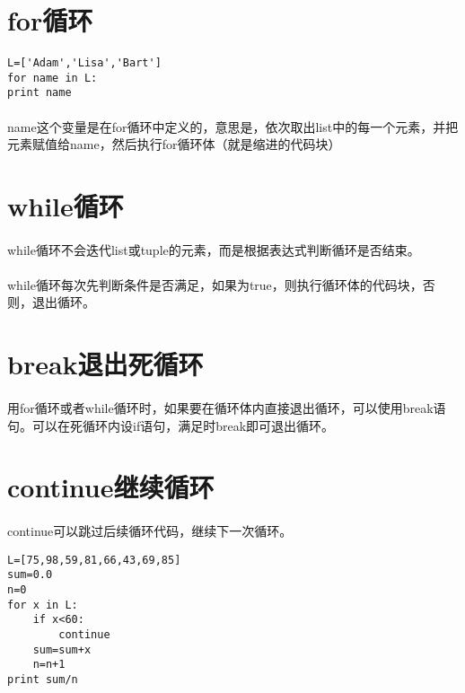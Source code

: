 \documentclass{article}
\begin{document}
\begin{CJK}{UTF8}{gbsn}
\section{for循环}
\paragraph{}
\begin{verbatim}
L=['Adam','Lisa','Bart']
for name in L:
print name
\end{verbatim}
\paragraph{}
name这个变量是在for循环中定义的，意思是，依次取出list中的每一个元素，并把元素赋值给name，然后执行for循环体（就是缩进的代码块）
\section{while循环}
\paragraph{}
while循环不会迭代list或tuple的元素，而是根据表达式判断循环是否结束。
\paragraph{}
while循环每次先判断条件是否满足，如果为true，则执行循环体的代码块，否则，退出循环。
\section{break退出死循环}
\paragraph{}
用for循环或者while循环时，如果要在循环体内直接退出循环，可以使用break语句。可以在死循环内设if语句，满足时break即可退出循环。
\section{continue继续循环}
\paragraph{}
continue可以跳过后续循环代码，继续下一次循环。
\begin{verbatim}
L=[75,98,59,81,66,43,69,85]
sum=0.0
n=0
for x in L:
    if x<60:
        continue
    sum=sum+x
    n=n+1
print sum/n
\end{verbatim}

\end{CJK}
\end{document}
